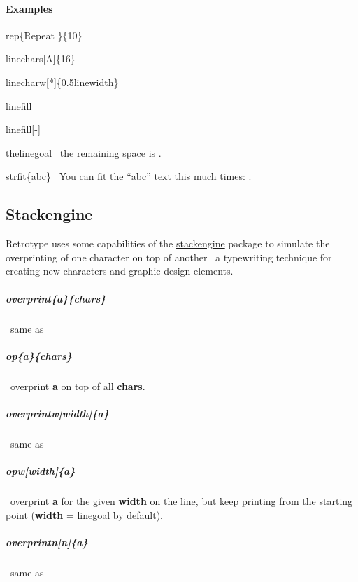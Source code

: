 \documentclass[english,12pt,openany,letterpaper]{book}
\begin{document}
\paragraph{Examples}

\bs rep\{Repeat \}\{10\}


\skipline

\bs linechars[A]\{16\}


\skipline

\bs linecharw[*]\{0.5\bs linewidth\}


\skipline

\bs linefill

\linefill

\skipline

\bs linefill[-]

\linefill[-]

\skipline

\bs the\bs linegoal \dash\ the remaining space is \linegoal.

\skipline

\bs strfit\{abc\} \dash\ You can fit the ``abc'' text this much times: .


\break


\subsection{Stackengine}

Retrotype uses some capabilities of the \href{https://www.ctan.org/pkg/stackengine}{stackengine} package to simulate the overprinting of one character on top of another \dash\ a typewriting technique for creating new characters and graphic design elements.

\skipline

\subparagraph{\bs overprint\{a\}\{chars\}} \dash\ same as

\subparagraph{\tabspace\bs op\{a\}\{chars\}} \dash\ overprint \textbf{a} on top of all \textbf{chars}.

\subparagraph{\bs overprintw[width]\{a\}} \dash\ same as

\subparagraph{\tabspace\bs opw[width]\{a\}} \dash\ overprint \textbf{a} for the given \textbf{width} on the line, but keep printing from the starting point (\textbf{width} = \bs linegoal by default).

\subparagraph{\bs overprintn[n]\{a\}} \dash\ same as
\end{document}
